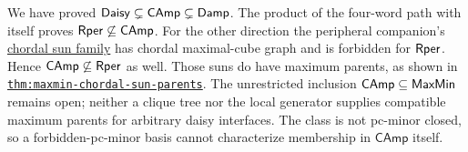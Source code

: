 We have proved
$\mathsf{Daisy}\subsetneq\mathsf{CAmp}\subsetneq\mathsf{Damp}$.
The product of the four-word path with itself proves
$\mathsf{Rper}\not\subseteq\mathsf{CAmp}$.
For the other direction the peripheral companion's
\href{../cover-recursive/research/rper_chordal_sun_obstructions.tex}
{chordal sun family} has chordal maximal-cube graph and is forbidden for
$\mathsf{Rper}$. Hence $\mathsf{CAmp}\not\subseteq\mathsf{Rper}$ as well.
Those suns do have maximum parents, as shown in
\href{../maxmin-forbidden/research/chordal_sun_parents.tex}
{\nolinkurl{thm:maxmin-chordal-sun-parents}}.
The unrestricted inclusion $\mathsf{CAmp}\subseteq\mathsf{MaxMin}$ remains open;
neither a clique tree nor the local generator supplies compatible maximum
parents for arbitrary daisy interfaces. The class is not pc-minor closed,
so a forbidden-pc-minor basis cannot characterize membership in
$\mathsf{CAmp}$ itself.
